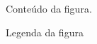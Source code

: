 \renewcommand{\figurename}{Figura}
\begin{figure}[h]
Conteúdo da figura.
\caption{Legenda da figura}
\end{figure}
